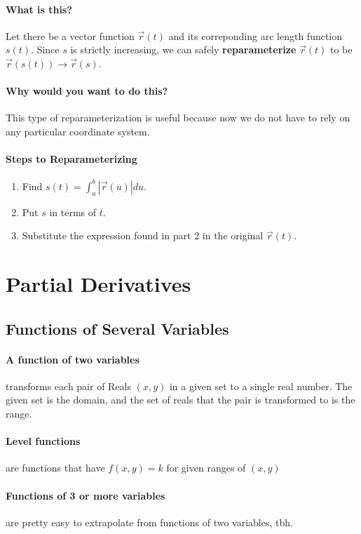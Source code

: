 \documentclass[a4paper,12pt]{report}
\begin{document}
\paragraph{What is this? } Let there be a vector function $\vec{r}(t)$ and its correponding arc length function 
$s(t)$. Since $s$ is strictly increasing, we can safely \textbf{reparameterize} $\vec{r}(t)$ to be 
$\vec{r}(s(t)) \to \vec{r}(s)$. 
\paragraph{Why would you want to do this? } This type of reparameterization is useful because now we do not have to
rely on any particular coordinate system.
\paragraph{Steps to Reparameterizing}
\begin{enumerate}
\item Find $s(t) = \int_a^b |\vec{r}(u)| du$.
\item Put $s$ in terms of $t$.
\item Substitute the expression found in part 2 in the original $\vec{r}(t)$.
\end{enumerate}


\section{Partial Derivatives}
\subsection{Functions of Several Variables}
\paragraph{A function of two variables } transforms each pair of Reals $(x, y)$ in a given set to a single real number. The given set is the domain, and the set of reals that the pair is transformed to is the range.

\paragraph{Level functions } are functions that have $f(x, y) = k$ for given ranges of $(x, y)$

\paragraph{Functions of 3 or more variables } are pretty easy to extrapolate from functions of two variables, tbh.
\end{document}
